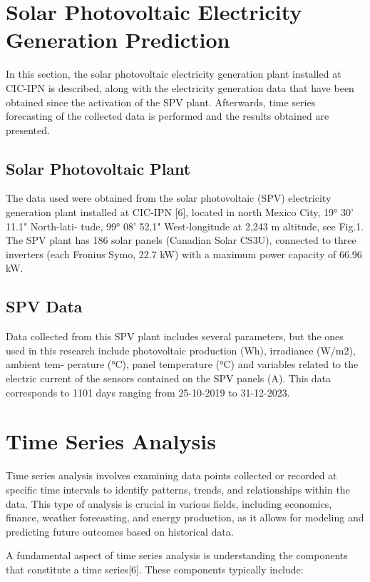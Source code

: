 \documentclass[a4paper,12pt]{article}
\begin{document}
\section{Solar Photovoltaic Electricity Generation Prediction}
In this section, the solar photovoltaic electricity generation plant installed at CIC-IPN
is described, along with the electricity generation data that have been obtained since the
activation of the SPV plant. Afterwards, time series forecasting of the collected data is performed and the results obtained are presented.

\subsection{Solar Photovoltaic Plant}
The data used were obtained from the solar photovoltaic (SPV) electricity generation
plant installed at CIC-IPN [6], located in north Mexico City, 19° 30' 11.1" North-lati-
tude, 99° 08' 52.1" West-longitude at 2,243 m altitude, see Fig.1. The SPV plant has
186 solar panels (Canadian Solar CS3U), connected to three inverters (each Fronius
Symo, 22.7 kW) with a maximum power capacity of 66.96 kW.

\subsection{SPV Data}
Data collected from this SPV plant includes several parameters, but the ones used in
this research include photovoltaic production (Wh), irradiance (W/m2), ambient tem-
perature (°C), panel temperature (°C) and variables related to the electric current of the sensors contained on the SPV panels (A). This data corresponds to 1101 days ranging from 25-10-2019 to 31-12-2023.

\section{Time Series Analysis}

Time series analysis involves examining data points collected or recorded at specific time intervals to identify patterns, trends, and relationships within the data. This type of analysis is crucial in various fields, including economics, finance, weather forecasting, and energy production, as it allows for modeling and predicting future outcomes based on historical data.

A fundamental aspect of time series analysis is understanding the components that constitute a time series[6]. These components typically include:
\end{document}
